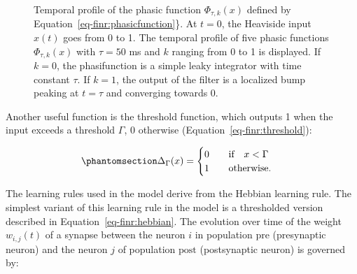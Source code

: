 \documentclass[
  11pt,
  a4paper,
]{scrbook}
\begin{document}
\begin{figure}


\caption{\label{fig-finr:alphafunction}Temporal profile of the phasic
function \(\Phi_{\tau, k}(x)\) defined by
Equation~\ref{eq-finr:phasicfunction}\}. At \(t=0\), the Heaviside input
\(x(t)\) goes from 0 to 1. The temporal profile of five phasic functions
\(\Phi_{\tau, k}(x)\) with \(\tau=50\) ms and \(k\) ranging from 0 to 1
is displayed. If \(k=0\), the phasifunction is a simple leaky integrator
with time constant \(\tau\). If \(k=1\), the output of the filter is a
localized bump peaking at \(t=\tau\) and converging towards 0.}

\end{figure}%

Another useful function is the threshold function, which outputs 1 when
the input exceeds a threshold \(\Gamma\), 0 otherwise
(Equation~\ref{eq-finr:threshold}):

\begin{equation}\phantomsection\label{eq-finr:threshold}{
    \Delta_{\Gamma}(x) = \begin{cases} 0 \qquad \text{if} \quad x < \Gamma \\
                                  1 \qquad \text{otherwise.} \end{cases}
}\end{equation}

The learning rules used in the model derive from the Hebbian learning
rule. The simplest variant of this learning rule in the model is a
thresholded version described in Equation~\ref{eq-finr:hebbian}. The
evolution over time of the weight \(w_{i,j}(t)\) of a synapse between
the neuron \(i\) in population \(\text{pre}\) (presynaptic neuron) and
the neuron \(j\) of population \(\text{post}\) (postsynaptic neuron) is
governed by:
\end{document}
